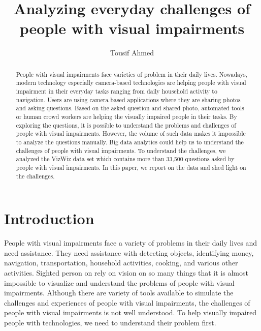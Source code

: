 \documentclass[sigconf]{acmart}
\begin{document}
\title{Analyzing everyday challenges of people with visual impairments}


\author{Tousif Ahmed}



\begin{abstract}
       People with visual impairments face varieties of problem in their daily lives. Nowadays, modern technology especially camera-based technologies are helping people with visual impairment in their everyday tasks ranging from daily household activity to navigation. Users are using camera based applications where they are sharing photos and asking questions. Based on the asked question and shared photo, automated tools or human crowd workers are helping the visually impaired people in their tasks. By exploring the questions, it is possible to understand the problems and challenges of people with visual impairments. However, the volume of such data makes it impossible to analyze the questions manually.  Big data analytics could help us to understand the challenges of people with visual impairments. To understand the challenges, we analyzed the VizWiz data set which contains more than 33,500 questions asked by people with visual impairments. In this paper, we report on the data and shed light on the challenges.  

\end{abstract}



\maketitle


\section{Introduction}
People with visual impairments face a variety of problems in their daily lives and need assistance. They need assistance with detecting objects, identifying money, navigation, transportation, household activities, cooking, and various other activities. Sighted person on rely on vision on so many things that it is almost impossible to visualize and understand the problems of people with visual impairments. Although there are variety of tools available to simulate the challenges and experiences of people with visual impairments, the challenges of people with visual impairments is not well understood. To help visually impaired people with technologies, we need to understand their problem first.
\end{document}
